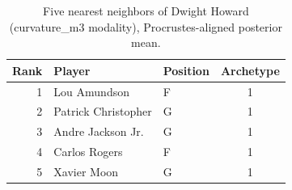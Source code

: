 \begin{table}[htbp]
  \centering\small
  \begin{tabular}{rllc}
    \toprule
    Rank & Player & Position & Archetype \\
    \midrule
    1 & Lou Amundson & F & 1 \\
    2 & Patrick Christopher & G & 1 \\
    3 & Andre Jackson Jr. & G & 1 \\
    4 & Carlos Rogers & F & 1 \\
    5 & Xavier Moon & G & 1 \\
    \bottomrule
  \end{tabular}
  \caption{Five nearest neighbors of Dwight Howard (curvature_m3 modality), Procrustes-aligned posterior mean.}
  \label{tab:Dwight_Howard_neighbors_curvature_m3}
\end{table}

